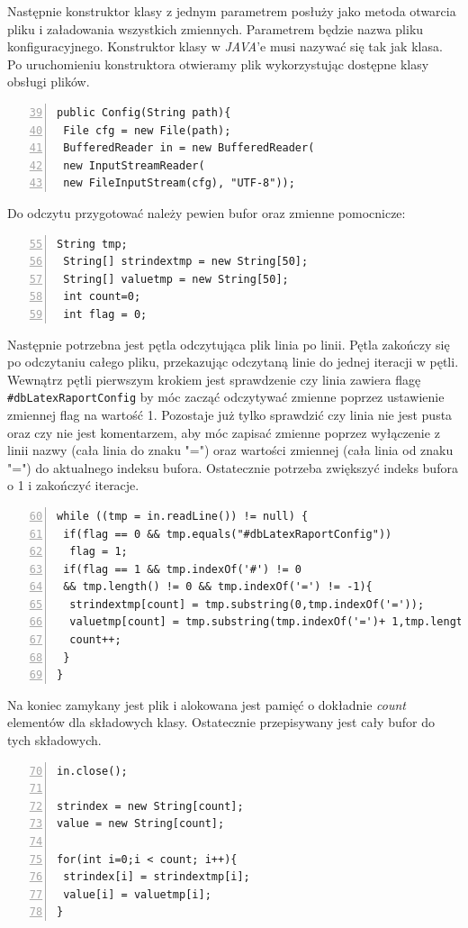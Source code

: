 Następnie konstruktor klasy z jednym parametrem posłuży jako metoda otwarcia pliku i załadowania wszystkich zmiennych. Parametrem będzie nazwa pliku konfiguracyjnego. Konstruktor klasy w \emph{JAVA}'e musi nazywać się tak jak klasa. Po uruchomieniu konstruktora otwieramy plik wykorzystując dostępne klasy obsługi plików.
\begin{lstlisting}[numbers=left,firstnumber=39]
public Config(String path){
 File cfg = new File(path);
 BufferedReader in = new BufferedReader(
 new InputStreamReader(
 new FileInputStream(cfg), "UTF-8"));
\end{lstlisting}
Do odczytu przygotować należy pewien bufor oraz zmienne pomocnicze:
\begin{lstlisting}[numbers=left,firstnumber=55]
 String tmp;
 String[] strindextmp = new String[50];
 String[] valuetmp = new String[50];
 int count=0;
 int flag = 0;
\end{lstlisting}

Następnie potrzebna jest pętla odczytująca plik linia po linii. Pętla zakończy się po odczytaniu całego pliku, przekazując odczytaną linie do jednej iteracji w pętli. Wewnątrz pętli pierwszym krokiem jest sprawdzenie czy linia zawiera flagę \texttt{\#dbLatexRaportConfig} by móc zacząć odczytywać zmienne poprzez ustawienie zmiennej flag na wartość 1. Pozostaje już tylko sprawdzić czy linia nie jest pusta oraz czy nie jest komentarzem, aby móc zapisać zmienne poprzez wyłączenie z linii nazwy (cała linia do znaku "=") oraz wartości zmiennej (cała linia od znaku "=") do aktualnego indeksu bufora. Ostatecznie potrzeba zwiększyć indeks bufora o 1 i zakończyć iteracje.
\begin{lstlisting}[numbers=left,firstnumber=60]
while ((tmp = in.readLine()) != null) {
 if(flag == 0 && tmp.equals("#dbLatexRaportConfig"))
  flag = 1;
 if(flag == 1 && tmp.indexOf('#') != 0
 && tmp.length() != 0 && tmp.indexOf('=') != -1){
  strindextmp[count] = tmp.substring(0,tmp.indexOf('='));
  valuetmp[count] = tmp.substring(tmp.indexOf('=')+ 1,tmp.length());
  count++;
 }
}
\end{lstlisting}

Na koniec zamykany jest plik i alokowana jest pamięć o dokładnie \emph{count} elementów dla składowych klasy. Ostatecznie przepisywany jest cały bufor do tych składowych.
\begin{lstlisting}[numbers=left,firstnumber=70]
in.close();
        
strindex = new String[count];
value = new String[count];
                  
for(int i=0;i < count; i++){
 strindex[i] = strindextmp[i];
 value[i] = valuetmp[i];
}
\end{lstlisting}

